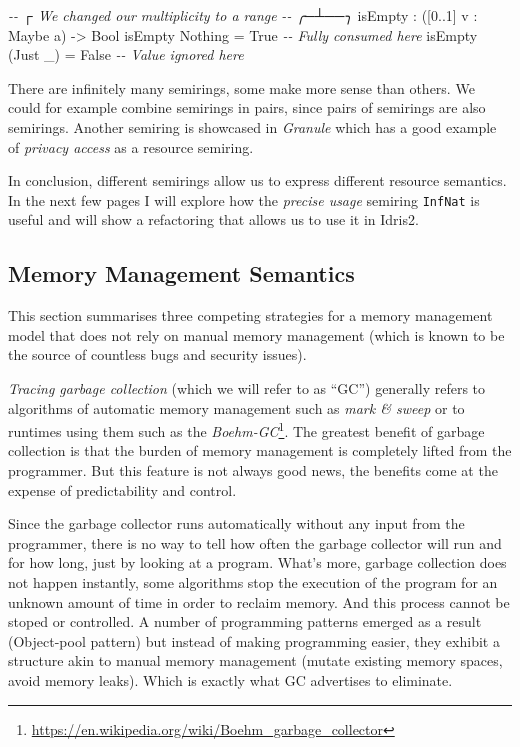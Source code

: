 \documentclass[
]{article}
\newenvironment{Shaded}{}{}
\newcommand{\CommentTok}[1]{\textcolor[rgb]{0.38,0.63,0.69}{\textit{#1}}}
\newcommand{\DataTypeTok}[1]{\textcolor[rgb]{0.56,0.13,0.00}{#1}}
\newcommand{\DecValTok}[1]{\textcolor[rgb]{0.25,0.63,0.44}{#1}}
\newcommand{\NormalTok}[1]{#1}
\newcommand{\OperatorTok}[1]{\textcolor[rgb]{0.40,0.40,0.40}{#1}}
\newcommand{\OtherTok}[1]{\textcolor[rgb]{0.00,0.44,0.13}{#1}}
\begin{document}
\begin{Shaded}
\begin{Highlighting}[]
\CommentTok{{-}{-}           ┌ We changed our multiplicity to a range}
\CommentTok{{-}{-}         ╭─┴──╮}
\NormalTok{isEmpty }\OperatorTok{:}\NormalTok{ ([}\DecValTok{0}\OperatorTok{..}\DecValTok{1}\NormalTok{] v }\OperatorTok{:} \DataTypeTok{Maybe}\NormalTok{ a) }\OtherTok{{-}\textgreater{}} \DataTypeTok{Bool}
\NormalTok{isEmpty }\DataTypeTok{Nothing} \OtherTok{=} \DataTypeTok{True}   \CommentTok{{-}{-} Fully consumed here}
\NormalTok{isEmpty (}\DataTypeTok{Just}\NormalTok{ \_) }\OtherTok{=} \DataTypeTok{False} \CommentTok{{-}{-} Value ignored here}
\end{Highlighting}
\end{Shaded}

There are infinitely many semirings, some make more sense than others.
We could for example combine semirings in pairs, since pairs of
semirings are also semirings. Another semiring is showcased in
\emph{Granule}\cite{granule} which has a good example of \emph{privacy
access} as a resource semiring.

In conclusion, different semirings allow us to express different
resource semantics. In the next few pages I will explore how the
\emph{precise usage} semiring \texttt{InfNat} is useful and will show a
refactoring that allows us to use it in Idris2.

\hypertarget{memory-management-semantics}{%
\subsection{Memory Management
Semantics}\label{memory-management-semantics}}

This section summarises three competing strategies for a memory
management model that does not rely on manual memory management (which
is known to be the source of countless bugs and security issues).

\emph{Tracing garbage collection} (which we will refer to as ``GC'')
generally refers to algorithms of automatic memory management such as
\emph{mark \& sweep} or to runtimes using them such as the
\emph{Boehm-GC}\footnote{\url{https://en.wikipedia.org/wiki/Boehm_garbage_collector}}.
The greatest benefit of garbage collection is that the burden of memory
management is completely lifted from the programmer. But this feature is
not always good news, the benefits come at the expense of predictability
and control.

Since the garbage collector runs automatically without any input from
the programmer, there is no way to tell how often the garbage collector
will run and for how long, just by looking at a program. What's more,
garbage collection does not happen instantly, some algorithms stop the
execution of the program for an unknown amount of time in order to
reclaim memory. And this process cannot be stoped or controlled. A
number of programming patterns emerged as a result (Object-pool pattern)
but instead of making programming easier, they exhibit a structure akin
to manual memory management (mutate existing memory spaces, avoid memory
leaks). Which is exactly what GC advertises to eliminate.
\end{document}
